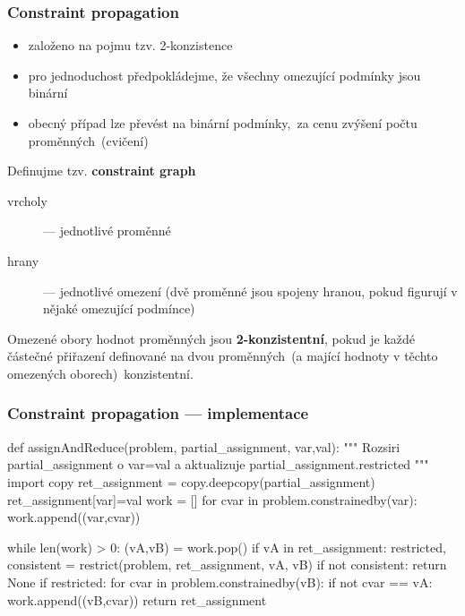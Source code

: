 \documentclass[red,professionalfont]{beamer}
\theoremstyle{definition}
\newcommand{\0}{\mbox{${\bf 0}$}}
\renewcommand{\emph}[1]{{\bf #1}}
\begin{document}
\begin{frame}[fragile]\frametitle{Constraint propagation}
\begin{itemize}
 \item založeno na pojmu tzv. 2-konzistence\pause
 \item pro jednoduchost předpokládejme, že všechny omezující podmínky jsou binární\pause
 \item obecný případ lze převést na binární podmínky,\pause\ za cenu zvýšení počtu proměnných\pause\ (cvičení)\pause
\end{itemize}

Definujme tzv. \emph{constraint graph}
\begin{description}
 \item[vrcholy] --- jednotlivé proměnné\pause
 \item[hrany]   --- jednotlivé omezení (dvě proměnné jsou spojeny hranou, pokud figurují v nějaké omezující podmínce)
\end{description}\pause

Omezené obory hodnot proměnných jsou \emph{2-konzistentní}, pokud je každé částečné přiřazení definované na
dvou proměnných\pause\ (a mající hodnoty v těchto omezených oborech)\pause\ konzistentní.

\end{frame}

\begin{frame}[fragile]\frametitle{Constraint propagation --- implementace}

\begin{python}[basicstyle=\ttfamily\tiny\setstretch{1}] 
 def assignAndReduce(problem, partial_assignment, var,val):
 """ Rozsiri partial_assignment o var=val a aktualizuje 
     partial_assignment.restricted """
  import copy
  ret_assignment = copy.deepcopy(partial_assignment)
  ret_assignment[var]=val
  work = []
  for cvar in problem.constrainedby(var):
    work.append((var,cvar))

  while len(work) > 0:
    (vA,vB) = work.pop()
    if vA in ret_assignment:
      restricted, consistent = restrict(problem, ret_assignment, vA, vB)
      if not consistent:
        return None
      if restricted:
        for cvar in problem.constrainedby(vB):
        if not cvar == vA:
          work.append((vB,cvar))
  return ret_assignment
\end{python}

\end{frame}
\end{document}

